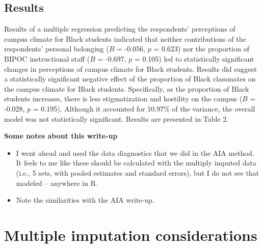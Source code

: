 \documentclass[
  11pt,
]{book}
\providecommand{\tightlist}{%
  \setlength{\itemsep}{0pt}\setlength{\parskip}{0pt}}
\begin{document}
\hypertarget{results-1}{%
\subsection{Results}\label{results-1}}

Results of a multiple regression predicting the respondents' perceptions of campus climate for Black students indicated that neither contributions of the respondents' personal belonging (\(B\) = -0.056, \(p\) = 0.623) nor the proportion of BIPOC instructional staff (\(B\) = -0.697, \(p\) = 0.105) led to statistically significant changes in perceptions of campus climate for Black students. Results did suggest a statistically significant negative effect of the proportion of Black classmates on the campus climate for Black students. Specifically, as the proportion of Black students increases, there is less stigmatization and hostility on the campus (\(B\) = -0.028, \(p\) = 0.195). Although it accounted for 10.97\% of the variance, the overall model was not statistically significant. Results are presented in Table 2.

\textbf{Some notes about this write-up}

\begin{itemize}
\tightlist
\item
  I went ahead and used the data diagnostics that we did in the AIA method. It feels to me like these should be calculated with the multiply imputed data (i.e., 5 sets, with pooled estimates and standard errors), but I do not see that modeled -- anywhere in R.
\item
  Note the similarities with the AIA write-up.
\end{itemize}

\hypertarget{multiple-imputation-considerations}{%
\section{Multiple imputation considerations}\label{multiple-imputation-considerations}}
\end{document}
